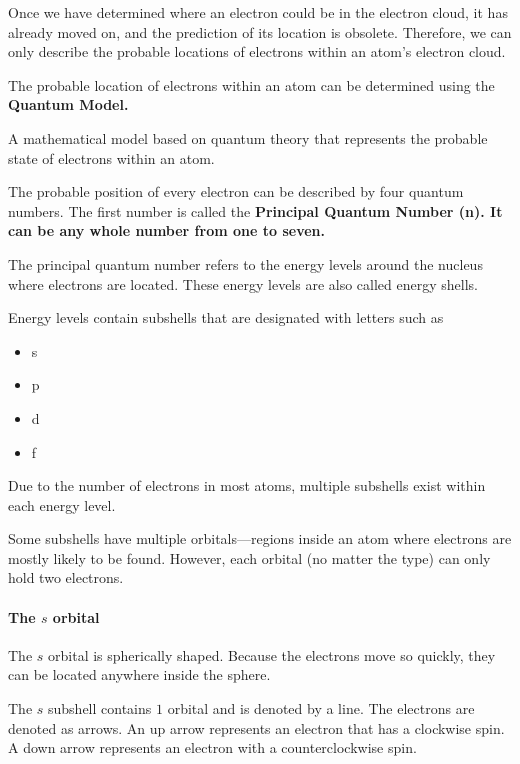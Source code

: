 
Once we have determined where an electron could be in the electron cloud, it has
already moved on, and the prediction of its location is obsolete. Therefore, we
can only describe the probable locations of electrons within an atom's electron
cloud.

The probable location of electrons within an atom can be determined using the \bf{Quantum Model}.

\begin{definition}
    A mathematical model based on quantum theory that represents the probable
    state of electrons within an atom.
\end{definition}

The probable position of every electron can be described by four quantum
numbers. The first number is called the \bf{Principal Quantum Number (n)}.
It can be any whole number from one to seven.

The principal quantum number refers to the energy levels around the nucleus
where electrons are located. These energy levels are also called energy shells.

Energy levels contain subshells that are designated with letters such as

\begin{itemize}
    \item s
    \item p
    \item d
    \item f
\end{itemize}

Due to the number of electrons in most atoms, multiple subshells exist
within each energy level.

Some subshells have multiple orbitals—regions inside an
atom where electrons are mostly likely to be found. However, each orbital (no
matter the type) can only hold two electrons.

\paragraph{The $s$ orbital} The $s$ orbital is spherically shaped. Because the electrons move so quickly, they
can be located anywhere inside the sphere.

The $s$ subshell contains $1$ orbital and is denoted by a line. The electrons
are denoted as arrows. An up arrow represents an electron that has a clockwise
spin. A down arrow represents an electron with a counterclockwise spin.

